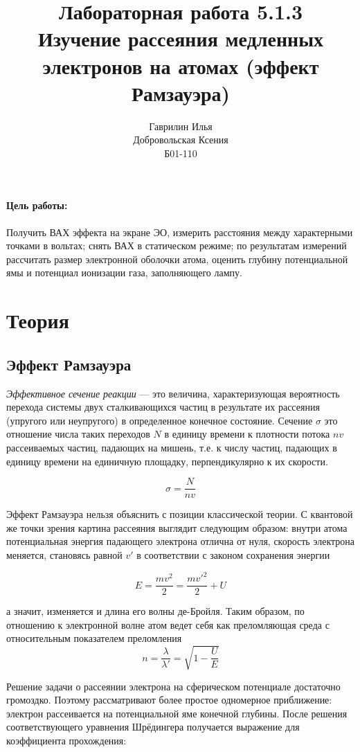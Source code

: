 \documentclass[a4paper,12pt]{article} %
\author{Гаврилин Илья\\
	Добровольская Ксения\\
	Б01-110}
\title{\textbf{Лабораторная работа 5.1.3\\ 
		Изучение рассеяния медленных электронов на атомах (эффект Рамзауэра)}}
\begin{document}
	\maketitle
	\paragraph*{Цель работы: } Получить ВАХ эффекта на экране ЭО, измерить расстояния между характерными точками в вольтах; снять ВАХ в статическом режиме; по результатам измерений рассчитать размер электронной оболочки атома, оценить глубину потенциальной ямы и потенциал ионизации газа, заполняющего лампу.
	\section*{Теория}
	\subsection*{Эффект Рамзауэра}
	\textit{Эффективное сечение реакции} --- это величина, характеризующая вероятность перехода системы двух сталкивающихся частиц в результате их рассеяния (упругого или неупругого) в определенное конечное состояние. Сечение $\sigma$ это отношение числа таких переходов $N$ в единицу времени к плотности потока $nv$ рассеиваемых частиц, падающих на мишень, т.е. к числу частиц, падающих в единицу времени на единичную площадку, перпендикулярно к их скорости.
	
	\begin{equation}
		\sigma = \frac{N}{nv}
	\end{equation}
	
	Эффект Рамзауэра нельзя объяснить с позиции классической теории. С квантовой же точки зрения картина рассеяния выглядит следующим образом: внутри атома потенциальная энергия падающего электрона отлична от нуля, скорость электрона меняется, становясь равной $v'$ в соответствии с законом сохранения энергии 
	
	\[E = \frac{mv^2}{2} = \frac{mv'^2}{2}+U\]
	
	а значит, изменяется и длина его волны де-Бройля. Таким образом, по отношению к электронной волне атом ведет себя как преломляющая среда с относительным показателем преломления
	\begin{equation}
		n = \frac{\lambda}{\lambda'} = \sqrt{1 - \frac{U}{E}}
	\end{equation}
	
	Решение задачи о рассеянии электрона на сферическом потенциале достаточно громоздко. Поэтому рассматривают более простое одномерное приближение: электрон рассеивается на потенциальной яме конечной глубины. После решения соответствующего уравнения Шрёдингера получается выражение для коэффициента прохождения:
	
\end{document}
